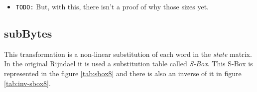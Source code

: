 \documentclass[10pt,a4paper,twoside]{llncs}
\begin{document}
\begin{itemize}
 \item \texttt{TODO:} But, with this, there isn't a proof of why those sizes yet.
\end{itemize}



\subsection{subBytes}\label{sec:subBytes}
This transformation is a non-linear substitution of each word in the \emph{state} matrix. In the original Rijndael it is used a substitution table called \emph{S-Box}. This S-Box is represented in the figure \ref{tab:sbox8} and there is also an inverse of it in figure \ref{tab:inv-sbox8}.
\end{document}
